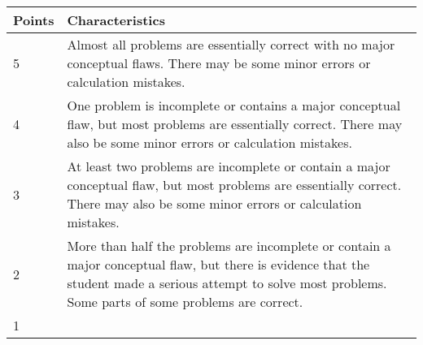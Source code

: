 \documentclass[11pt,]{article}
\begin{document}
\begin{longtable}[]{@{}ll@{}}
\toprule
\begin{minipage}[b]{0.08\columnwidth}\raggedright\strut
Points
\strut\end{minipage} &
\begin{minipage}[b]{0.86\columnwidth}\raggedright\strut
Characteristics
\strut\end{minipage}\tabularnewline
\midrule
\endhead
\begin{minipage}[t]{0.08\columnwidth}\raggedright\strut
5
\strut\end{minipage} &
\begin{minipage}[t]{0.86\columnwidth}\raggedright\strut
Almost all problems are essentially correct with no major conceptual
flaws. There may be some minor errors or calculation mistakes.
\strut\end{minipage}\tabularnewline
\begin{minipage}[t]{0.08\columnwidth}\raggedright\strut
4
\strut\end{minipage} &
\begin{minipage}[t]{0.86\columnwidth}\raggedright\strut
One problem is incomplete or contains a major conceptual flaw, but most
problems are essentially correct. There may also be some minor errors or
calculation mistakes.
\strut\end{minipage}\tabularnewline
\begin{minipage}[t]{0.08\columnwidth}\raggedright\strut
3
\strut\end{minipage} &
\begin{minipage}[t]{0.86\columnwidth}\raggedright\strut
At least two problems are incomplete or contain a major conceptual flaw,
but most problems are essentially correct. There may also be some minor
errors or calculation mistakes.
\strut\end{minipage}\tabularnewline
\begin{minipage}[t]{0.08\columnwidth}\raggedright\strut
2
\strut\end{minipage} &
\begin{minipage}[t]{0.86\columnwidth}\raggedright\strut
More than half the problems are incomplete or contain a major conceptual
flaw, but there is evidence that the student made a serious attempt to
solve most problems. Some parts of some problems are correct.
\strut\end{minipage}\tabularnewline
\begin{minipage}[t]{0.08\columnwidth}\raggedright\strut
1
\strut\end{minipage} &

\end{longtable}
\end{document}
